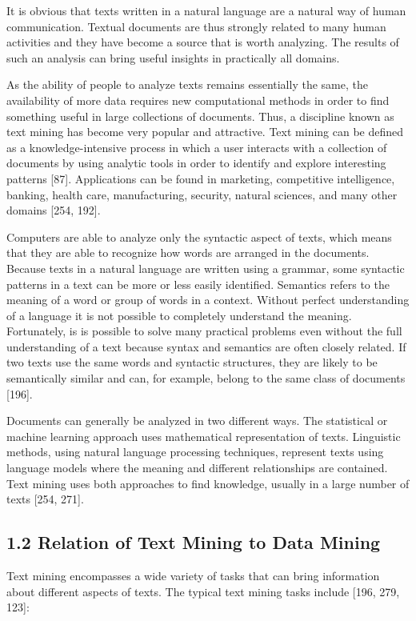 \documentclass[10pt]{book}
\begin{document}
It is obvious that texts written in a natural language are a natural way of human communication. Textual documents are thus strongly related to many human activities and they have become a source that is worth analyzing. The results of such an analysis can bring useful insights in practically all domains.

As the ability of people to analyze texts remains essentially the same, the availability of more data requires new computational methods in order to find something useful in large collections of documents. Thus, a discipline known as text mining has become very popular and attractive. Text mining can be defined as a knowledge-intensive process in which a user interacts with a collection of\\[0pt]
documents by using analytic tools in order to identify and explore interesting patterns [87]. Applications can be found in marketing, competitive intelligence, banking, health care, manufacturing, security, natural sciences, and many other domains [254, 192].

Computers are able to analyze only the syntactic aspect of texts, which means that they are able to recognize how words are arranged in the documents. Because texts in a natural language are written using a grammar, some syntactic patterns in a text can be more or less easily identified. Semantics refers to the meaning of a word or group of words in a context. Without perfect understanding of a language it is not possible to completely understand the meaning. Fortunately, is is possible to solve many practical problems even without the full understanding of a text because syntax and semantics are often closely related. If two texts use the same words and syntactic structures, they are likely to be semantically similar and can, for example, belong to the same class of documents [196].

Documents can generally be analyzed in two different ways. The statistical or machine learning approach uses mathematical representation of texts. Linguistic methods, using natural language processing techniques, represent texts using language models where the meaning and different relationships are contained. Text mining uses both approaches to find knowledge, usually in a large number of texts [254, 271].

\subsection*{1.2 Relation of Text Mining to Data Mining}
Text mining encompasses a wide variety of tasks that can bring information about different aspects of texts. The typical text mining tasks include [196, 279, 123]:
\end{document}
